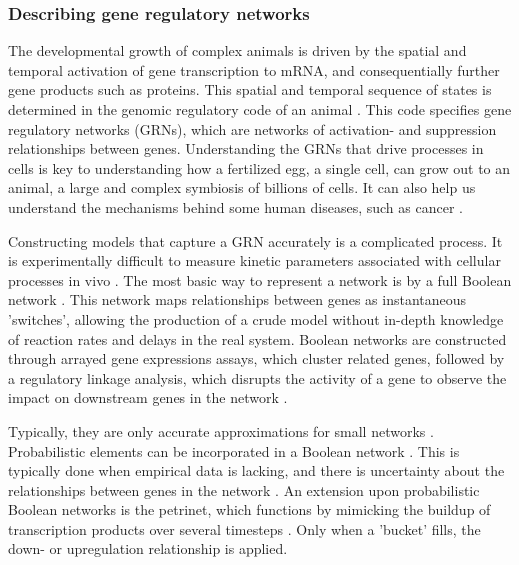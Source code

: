 \documentclass[../main.tex]{subfiles}
\begin{document}
\subsubsection{Describing gene regulatory networks}

The developmental growth of complex animals is driven by the spatial and temporal activation of gene transcription to mRNA, and consequentially further gene products such as proteins.
This spatial and temporal sequence of states is determined in the genomic regulatory code of an animal \cite{bolouri2002modeling, kuhn2009monte}.
This code specifies gene regulatory networks (GRNs), which are networks of activation- and suppression relationships between genes.
Understanding the GRNs that drive processes in cells is key to understanding how a fertilized egg, a single cell, can grow out to an animal, a large and complex symbiosis of billions of cells.
It can also help us understand the mechanisms behind some human diseases, such as cancer \cite{qian2008inference}.

Constructing models that capture a GRN accurately is a complicated process.
It is experimentally difficult to measure kinetic parameters associated with cellular processes in vivo \cite{bolouri2002modeling}.
The most basic way to represent a network is by a full Boolean network \cite{bolouri2002modeling}.
This network maps relationships between genes as instantaneous 'switches', allowing the production of a crude model without in-depth knowledge of reaction rates and delays in the real system.
Boolean networks are constructed through arrayed gene expressions assays, which cluster related genes, followed by a regulatory linkage analysis, which disrupts the activity of a gene to observe the impact on downstream genes in the network \cite{bolouri2002modeling, wu2013high}.

Typically, they are only accurate approximations for small networks \cite{karlebach2008modelling}.
Probabilistic elements can be incorporated in a Boolean network \cite{schlitt2007current}.
This is typically done when empirical data is lacking, and there is uncertainty about the relationships between genes in the network \cite{karlebach2008modelling}.
An extension upon probabilistic Boolean networks is the petrinet, which functions by mimicking the buildup of transcription products over several timesteps \cite{karlebach2008modelling}.
Only when a 'bucket' fills, the down- or upregulation relationship is applied.
\end{document}
